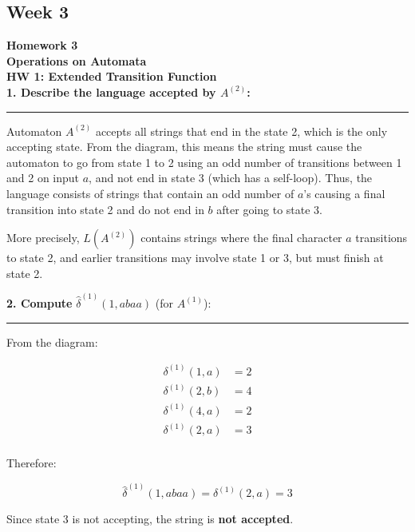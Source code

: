 \documentclass{article}
\theoremstyle{theorem}
\theoremstyle{definition}
\theoremstyle{remark}
\begin{document}
\subsection{Week 3}
\textbf{Homework 3} \\
\textbf{Operations on Automata} \\

\vspace{1em}
\textbf{HW 1: Extended Transition Function} \\

\textbf{1. Describe the language accepted by \( A^{(2)} \):}

\vspace{0.5em}
\hrule
\vspace{0.5em}

Automaton \( A^{(2)} \) accepts all strings that end in the state 2, which is the only accepting state.  
From the diagram, this means the string must cause the automaton to go from state 1 to 2 using an odd number of transitions between 1 and 2 on input \( a \), and not end in state 3 (which has a self-loop).  
Thus, the language consists of strings that contain an odd number of \( a \)'s causing a final transition into state 2 and do not end in \( b \) after going to state 3.

More precisely, \( L(A^{(2)}) \) contains strings where the final character \( a \) transitions to state 2, and earlier transitions may involve state 1 or 3, but must finish at state 2.

\vspace{1em}
\textbf{2. Compute } \( \hat{\delta}^{(1)}(1, abaa) \) (for \( A^{(1)} \)):

\vspace{0.5em}
\hrule
\vspace{0.5em}

From the diagram:

\[
\begin{aligned}
\delta^{(1)}(1, a) &= 2 \\
\delta^{(1)}(2, b) &= 4 \\
\delta^{(1)}(4, a) &= 2 \\
\delta^{(1)}(2, a) &= 3 \\
\end{aligned}
\]

Therefore:

\[
\hat{\delta}^{(1)}(1, abaa) = \delta^{(1)}(2, a) = 3
\]

Since state 3 is not accepting, the string is \textbf{not accepted}.
\end{document}
